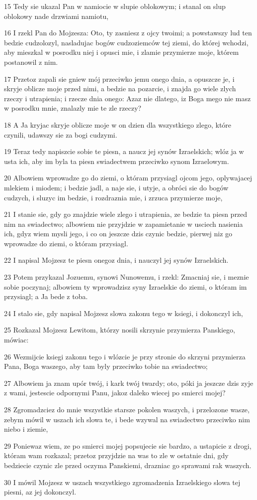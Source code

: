 \par 15 Tedy sie ukazal Pan w namiocie w slupie oblokowym; i stanal on slup oblokowy nade drzwiami namiotu,
\par 16 I rzekl Pan do Mojzesza: Oto, ty zasniesz z ojcy twoimi; a powstawszy lud ten bedzie cudzolozyl, nasladujac bogów cudzoziemców tej ziemi, do której wchodzi, aby mieszkal w posrodku niej i opusci mie, i zlamie przymierze moje, którem postanowil z nim.
\par 17 Przetoz zapali sie gniew mój przeciwko jemu onego dnia, a opuszcze je, i skryje oblicze moje przed nimi, a bedzie na pozarcie, i znajda go wiele zlych rzeczy i utrapienia; i rzecze dnia onego: Azaz nie dlatego, iz Boga mego nie masz w posrodku mnie, znalazly mie te zle rzeczy?
\par 18 A Ja kryjac skryje oblicze moje w on dzien dla wszystkiego zlego, które czynili, udawszy sie za bogi cudzymi.
\par 19 Teraz tedy napiszcie sobie te piesn, a naucz jej synów Izraelskich; wlóz ja w usta ich, aby im byla ta piesn swiadectwem przeciwko synom Izraelowym.
\par 20 Albowiem wprowadze go do ziemi, o któram przysiagl ojcom jego, oplywajacej mlekiem i miodem; i bedzie jadl, a naje sie, i utyje, a obróci sie do bogów cudzych, i sluzyc im bedzie, i rozdraznia mie, i zrzuca przymierze moje,
\par 21 I stanie sie, gdy go znajdzie wiele zlego i utrapienia, ze bedzie ta piesn przed nim na swiadectwo; albowiem nie przyjdzie w zapamietanie w usciech nasienia ich, gdyz wiem mysli jego, i co on jeszcze dzis czynic bedzie, pierwej niz go wprowadze do ziemi, o któram przysiagl.
\par 22 I napisal Mojzesz te piesn onegoz dnia, i nauczyl jej synów Izraelskich.
\par 23 Potem przykazal Jozuemu, synowi Nunowemu, i rzekl: Zmacniaj sie, i meznie sobie poczynaj; albowiem ty wprowadzisz syny Izraelskie do ziemi, o któram im przysiagl; a Ja bede z toba.
\par 24 I stalo sie, gdy napisal Mojzesz slowa zakonu tego w ksiegi, i dokonczyl ich,
\par 25 Rozkazal Mojzesz Lewitom, którzy nosili skrzynie przymierza Panskiego, mówiac:
\par 26 Wezmijcie ksiegi zakonu tego i wlózcie je przy stronie do skrzyni przymierza Pana, Boga waszego, aby tam byly przeciwko tobie na swiadectwo;
\par 27 Albowiem ja znam upór twój, i kark twój twardy; oto, póki ja jeszcze dzis zyje z wami, jestescie odpornymi Panu, jakoz daleko wiecej po smierci mojej?
\par 28 Zgromadzciez do mnie wszystkie starsze pokolen waszych, i przelozone wasze, zebym mówil w uszach ich slowa te, i bede wzywal na swiadectwo przeciwko nim niebo i ziemie,
\par 29 Poniewaz wiem, ze po smierci mojej popsujecie sie bardzo, a ustapicie z drogi, któram wam rozkazal; przetoz przyjdzie na was to zle w ostatnie dni, gdy bedziecie czynic zle przed oczyma Panskiemi, drazniac go sprawami rak waszych.
\par 30 I mówil Mojzesz w uszach wszystkiego zgromadzenia Izraelskiego slowa tej piesni, az jej dokonczyl.

